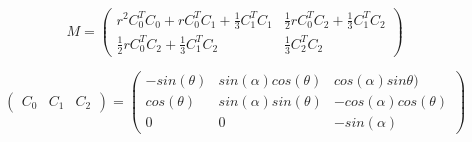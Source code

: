 \begin{equation}  
M = 
    \left(
    \begin{matrix}
        r^2C_0^T C_0 + rC_0^T C_1 + \frac{1}{3} C_1^T C_1 &
        \frac{1}{2} r C_0^T C_2 + \frac{1}{3} C_1^TC_2 \\
        \frac{1}{2} r C_0^T C_2 + \frac{1}{3} C_1^TC_2   &
        \frac{1}{3} C_2^T C_2
    \end{matrix}
    \right)
\end{equation}


\begin{equation}
    \left( \begin{matrix}
        C_0 & C_1 & C_2
    \end{matrix} \right)
   =
        \left(  \begin{matrix} 
        -sin(\theta) &   sin(\alpha) cos(\theta) & cos(\alpha) sin\theta) \\
        cos(\theta) & sin(\alpha) sin(\theta) &  - cos(\alpha) cos(\theta) \\
        0 &  0 &- sin(\alpha)
    \end{matrix}\right) 
\end{equation}
